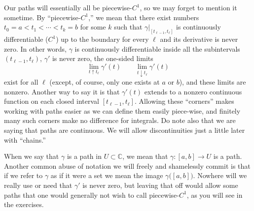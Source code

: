 \documentclass[12pt,openany]{book}
\newcommand{\C}{{\mathbb{C}}}
\newcommand{\myquote}[1]{``#1''}
\theoremstyle{plain}
\theoremstyle{remark}
\theoremstyle{definition}
\theoremstyle{exercise}
\theoremstyle{example}
\begin{document}
Our paths will essentially all be piecewise-$C^1$,
so we may forget to mention it sometime.
By \myquote{piecewise-$C^1$,}
we mean that there exist numbers $t_0 = a < t_1 < \cdots
< t_k = b$ for some $k$ such that $\gamma|_{[t_{\ell-1},t_\ell]}$ is
continuously differentiable ($C^1$) up to
the boundary for every $\ell$ and its derivative is never zero.
In other words, $\gamma$ is continuously differentiable inside all the
subintervals $(t_{\ell-1},t_\ell)$, $\gamma'$ is never zero, the one-sided limits
\begin{equation*}
\lim_{t \uparrow t_\ell} \gamma'(t) \qquad
\lim_{t \downarrow t_\ell} \gamma'(t)
\end{equation*}
exist for all $\ell$ (except, of course, only one exists at $a$ or $b$),
and these limits are nonzero.
Another way to say it is that $\gamma'(t)$ extends to a nonzero
continuous function on each closed interval $[t_{\ell-1},t_{\ell}]$.
Allowing these \myquote{corners} makes working with paths easier
as we can define them easily piece-wise, and finitely many such corners
make no difference for integrals.
Do note also that we are saying that paths are continuous.  We will allow
discontinuities just a little later with \myquote{chains.}

When we say that $\gamma$ is a path in $U \subset \C$,
we mean that
$\gamma \colon [a,b] \to U$ is a path.  Another common abuse of notation we
will freely and shamelessly commit is that if we refer to $\gamma$
as if it were a set we mean the image $\gamma\bigl([a,b]\bigr)$.
Nowhere will we really use or need that $\gamma'$ is never zero,
but leaving that off would allow some paths that one would generally not
wish to call piecewise-$C^1$,
as you will see in the exercises.
\end{document}
